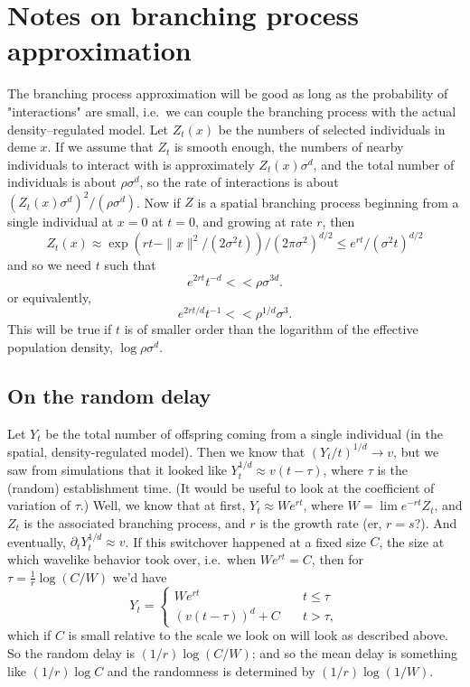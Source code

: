 \documentclass{article}
\begin{document}
\section{Notes on branching process approximation}

The branching process approximation will be good as long as the probability of "interactions" are small,
i.e.\ we can couple the branching process with the actual density--regulated model.
Let $Z_t(x)$ be the numbers of selected individuals in deme $x$.
If we assume that $Z_t$ is smooth enough, 
the numbers of nearby individuals to interact with is approximately $Z_t(x) \sigma^d$,
and the total number of individuals is about $\rho \sigma^d$,
so the rate of interactions is about $(Z_t(x) \sigma^d)^2/(\rho \sigma^d)$.
Now if $Z$ is a spatial branching process beginning from a single individual at $x=0$ at $t=0$, 
and growing at rate $r$, then 
\[ 
    Z_t(x) \approx \exp(rt - \|x\|^2/(2\sigma^2 t))/ (2 \pi \sigma^2)^{d/2} 
        \le e^{rt} / ( \sigma^2 t)^{d/2}
\]
and so we need $t$ such that
\[
    e^{2rt} t^{-d} << \rho \sigma^{3d} .
\]
or equivalently,
\[
    e^{2rt/d} t^{-1} << \rho^{1/d} \sigma^3 .
\]
This will be true if $t$ is of smaller order than the logarithm of the effective population density, $\log \rho \sigma^d$.

\subsection{On the random delay}

Let $Y_t$ be the total number of offspring coming from a single individual
(in the spatial, density-regulated model).
Then we know that $(Y_t/t)^{1/d} \to v$, 
but we saw from simulations that it looked like $Y_t^{1/d} \approx v(t-\tau)$,
where $\tau$ is the (random) establishment time.
(It would be useful to look at the coefficient of variation of $\tau$.)
Well, we know that at first, $Y_t \approx W e^{rt}$, 
where $W= \lim e^{-rt} Z_t$, and $Z_t$ is the associated branching process,
and $r$ is the growth rate (er, $r=s$?).
And eventually, $\partial_t Y_t^{1/d} \approx v$.
If this switchover happened at a fixed size $C$,
the size at which wavelike behavior took over,
i.e.\ when $W e^{rt} = C$,
then for $\tau = \frac{1}{r}\log(C/W)$ we'd have 
\[
    Y_t = \begin{cases}
        W e^{rt} \quad & t \le \tau \\
        (v (t-\tau))^d + C \quad & t > \tau ,
\end{cases}
\]
which if $C$ is small relative to the scale we look on will look as described above.
So the random delay is $(1/r)\log(C/W)$; and so the mean delay is something like $(1/r)\log C$
and the randomness is determined by $(1/r)\log (1/W)$.
\end{document}
